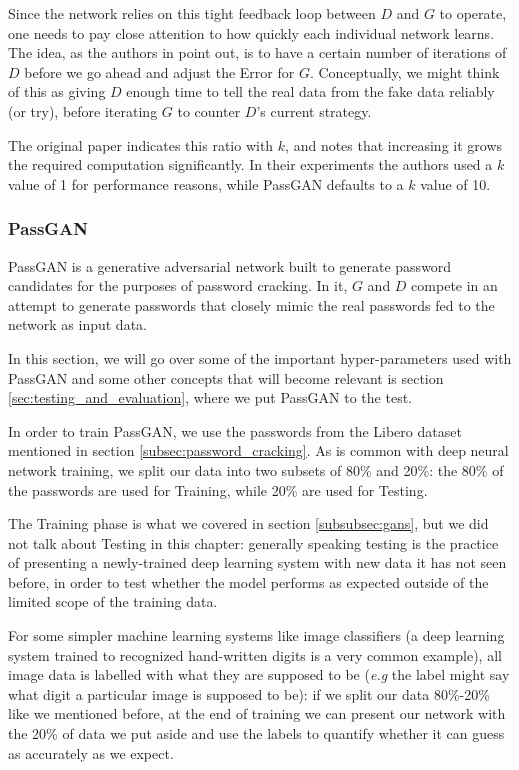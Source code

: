 Since the network relies on this tight feedback loop between $D$ and $G$ to operate, one needs to pay close attention to how quickly each individual network learns.
The idea, as the authors in \cite{Goodfellow2014} point out, is to have a certain number of iterations of $D$ before we go ahead and adjust the Error for $G$. Conceptually, we might think of this as giving $D$ enough time to tell the real data from the fake data reliably (or try), before iterating $G$ to counter $D$'s current strategy.

The original paper indicates this ratio with $k$, and notes that increasing it grows the required computation significantly. In their experiments the authors used a $k$ value of 1 for performance reasons, while PassGAN defaults to a $k$ value of 10\cite{PassGAN}.

\subsubsection{PassGAN}\label{subsubsec:gans-passgan}
PassGAN is a generative adversarial network built to generate password candidates for the purposes of password cracking. In it, $G$ and $D$ compete in an attempt to generate passwords that closely mimic the real passwords fed to the network as input data.

In this section, we will go over some of the important hyper-parameters used with PassGAN and some other concepts that will become relevant is section \ref{sec:testing_and_evaluation}, where we put PassGAN to the test.

In order to train PassGAN, we use the passwords from the Libero dataset mentioned in section \ref{subsec:password_cracking}. As is common with deep neural network training, we split our data into two subsets of 80\% and 20\%: the 80\% of the passwords are used for Training, while 20\% are used for Testing. 

 The Training phase is what we covered in section \ref{subsubsec:gans}, but we did not talk about Testing in this chapter: generally speaking testing is the practice of presenting a newly-trained deep learning system with new data it has not seen before, in order to test whether the model performs as expected outside of the limited scope of the training data.

For some simpler machine learning systems like image classifiers (a deep learning system trained to recognized hand-written digits is a very common example), all image data is labelled with what they are supposed to be (\emph{e.g} the label might say what digit a particular image is supposed to be): if we split our data 80\%-20\% like we mentioned before, at the end of training we can present our network with the 20\% of data we put aside and use the labels to quantify whether it can guess as accurately as we expect. 

